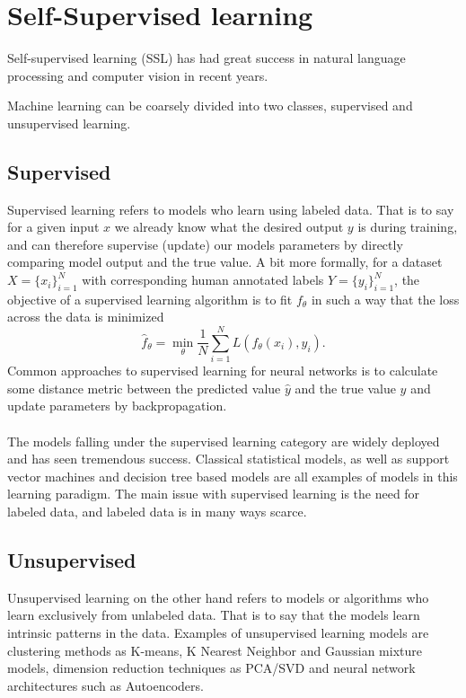 \documentclass[../../thesis.tex]{subfiles}
\begin{document}
\section{Self-Supervised learning}

Self-supervised learning (SSL) has had great success in natural language processing and computer vision in recent years. 

Machine learning can be coarsely divided into two classes, supervised and unsupervised learning. 

\subsection{Supervised}
Supervised learning refers to models who learn using labeled data. That is to say for a given input $x$ we already know what the desired output $y$ is during training, and can therefore supervise (update) our models parameters by directly comparing model output and the true value. A bit more formally, for a dataset $X = \{x_i\}_{i=1}^N$ with corresponding human annotated labels $Y = \{y_i\}_{i=1}^N$, the objective of a supervised learning algorithm is to fit $f_\theta$ in such a way that the loss across the data is minimized
\begin{equation}
    \widehat{f}_\theta = \min_\theta \frac{1}{N} \sum_{i=1}^N L(f_\theta(x_i),y_i).
\end{equation}
Common approaches to supervised learning for neural networks is to calculate some distance metric between the predicted value $\widehat{y}$ and the true value $y$ and update parameters by backpropagation.\\\\
The models falling under the supervised learning category are widely deployed and has seen tremendous success. Classical statistical models, as well as support vector machines and decision tree based models are all examples of models in this learning paradigm. The main issue with supervised learning is the need for labeled data, and labeled data is in many ways scarce.

\subsection{Unsupervised}
Unsupervised learning on the other hand refers to models or algorithms who learn exclusively from unlabeled data. That is to say that the models learn intrinsic patterns in the data. Examples of unsupervised learning models are clustering methods as K-means, K Nearest Neighbor and Gaussian mixture models, dimension reduction techniques as PCA/SVD and neural network architectures such as Autoencoders. 
\end{document}
